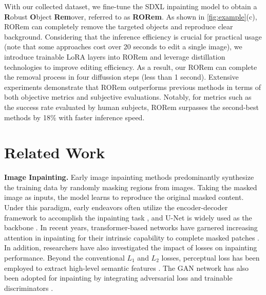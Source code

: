 \documentclass[10pt,twocolumn,letterpaper]{article}
\begin{document}
With our collected dataset, we fine-tune the SDXL inpainting model to obtain a \textbf{R}obust \textbf{O}bject \textbf{Rem}over, referred to as \textbf{RORem}. As shown in \cref{fig:example}(c), RORem can completely remove the targeted objects and reproduce clear background. Considering that the inference efficiency is crucial for practical usage (note that some approaches cost over 20 seconds to edit a single image), we introduce trainable LoRA layers into RORem and leverage distillation technologies  \cite{luo2023latent} to improve editing efficiency. As a result, our RORem can complete the removal process in four diffussion steps (less than 1 second). Extensive experiments demonstrate that RORem outperforms previous methods in terms of both objective metrics and subjective evaluations. Notably, for metrics such as the success rate evaluated by human subjects, RORem surpasses the second-best methods by 18\% with faster inference speed.

\section{Related Work}

\noindent\textbf{Image Inpainting.} Early image inpainting methods predominantly synthesize the training data by randomly masking regions from images. Taking the masked image as inputs, the model learns to reproduce the original masked content. Under this paradigm, early endeavors often utilize the encoder-decoder framework to accomplish the inpainting task \cite{pathak2016context,suvorov2022resolution,ma2022regionwise}, and U-Net \cite{ronneberger2015u} is widely used as the backbone  \cite{liu2018image,liu2020rethinking,yan2018shift,zeng2019learning}. In recent years, transformer-based networks have garnered increasing attention in inpainting for their intrinsic capability to complete masked patches \cite{li2022mat,dong2022incremental,shamsolmoali2023transinpaint,ko2023continuously,zhou2023propainter,cao2023zits,yu2021diverse}.
In addition, researchers have also investigated the impact of losses on inpainting performance. Beyond the conventional $L_1$ and $L_2$ losses, perceptual loss has been employed to extract high-level semantic features \cite{yang2017high,song2018contextual,li2020recurrent,liu2018image}. The GAN \cite{goodfellow2020generative} network has also been adopted for inpainting by integrating adversarial loss and trainable discriminators \cite{pathak2016context,yeh2017semantic,yu2018generative,liu2019coherent}.
\end{document}

